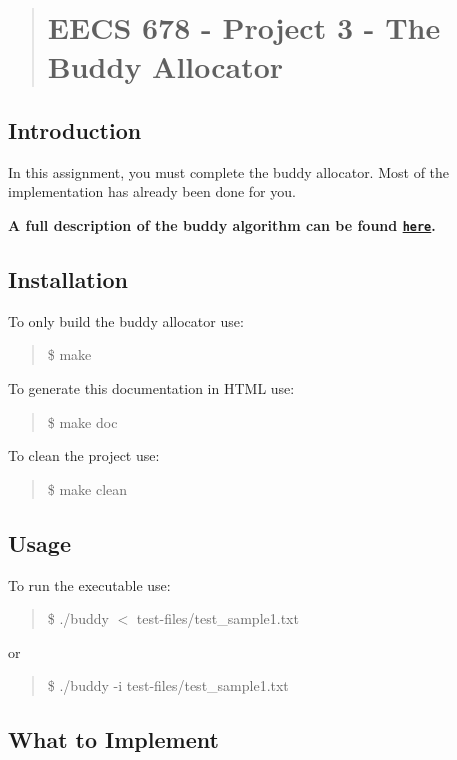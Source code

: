 \begin{quote}
\section*{E\+E\+CS 678 -\/ Project 3 -\/ The Buddy Allocator}

\end{quote}


\subsection*{Introduction}

In this assignment, you must complete the buddy allocator. Most of the implementation has already been done for you.

{\bfseries A full description of the buddy algorithm can be found \href{../../project3-description.pdf}{\tt here}.}

\subsection*{Installation}

To only build the buddy allocator use\+: \begin{quote}
{\ttfamily \$ make} \end{quote}


To generate this documentation in H\+T\+ML use\+:

\begin{quote}
{\ttfamily \$ make doc} \end{quote}


To clean the project use\+: \begin{quote}
{\ttfamily \$ make clean} \end{quote}


\subsection*{Usage}

To run the executable use\+: \begin{quote}
{\ttfamily \$ ./buddy $<$ test-\/files/test\+\_\+sample1.\+txt} \end{quote}
or \begin{quote}
{\ttfamily \$ ./buddy -\/i test-\/files/test\+\_\+sample1.\+txt} \end{quote}


\subsection*{What to Implement}

